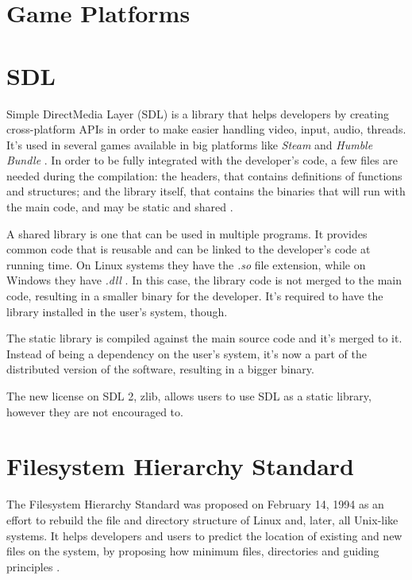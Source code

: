 \section{Game Platforms}
\label {sec:game_platforms}


\section{SDL}
\label {sec:sdl}

Simple DirectMedia Layer (SDL) is a library that helps developers by creating cross-platform APIs in order to make easier handling video, input, audio, threads. It's used in several games available in big platforms like \textit{Steam} and \textit{Humble Bundle} \cite{sdl2017}. In order to be fully integrated with the developer's code, a few files are needed during the compilation: the headers, that contains definitions of functions and structures; and the library itself, that contains the binaries that will run with the main code, and may be static and shared \cite{lazyfoo2017}.

A shared library is one that can be used in multiple programs. It provides common code that is reusable and can be linked to the developer's code at running time. On Linux systems they have the \textit{.so} file extension, while on Windows they have \textit{.dll} \cite{howto2017shared}. In this case, the library code is not merged to the main code, resulting in a smaller binary for the developer. It's required to have the library installed in the user's system, though.

The static library is compiled against the main source code and it's merged to it. Instead of being a dependency on the user's system, it's now a part of the distributed version of the software, resulting in a bigger binary.

The new license on SDL 2, zlib, allows users to use SDL as a static library, however they are not encouraged to.


\section{Filesystem Hierarchy Standard}
\label {sec:fhs}

The Filesystem Hierarchy Standard was proposed on February 14, 1994 as an effort to rebuild the file and directory structure of Linux and, later, all Unix-like systems. It helps developers and users to predict the location of existing and new files on the system, by proposing how minimum files, directories and guiding principles \cite{allbery2015filesystem}.

